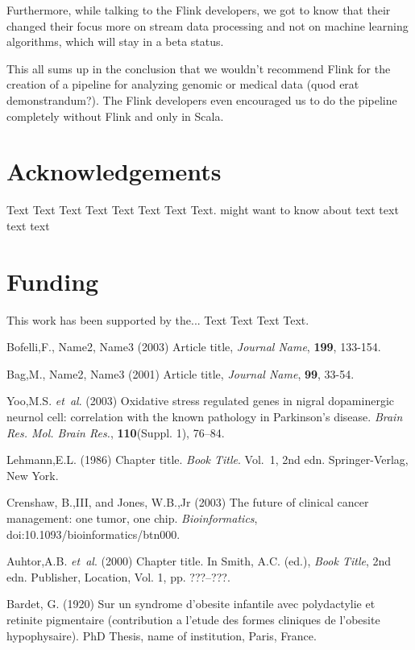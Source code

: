 \documentclass{bioinfo}
\begin{document}
Furthermore, while talking to the Flink developers, we got to know that their changed their focus more on stream data processing and not on machine learning algorithms, which will stay in a beta status.

This all sums up in the conclusion that we wouldn't recommend Flink for the creation of a pipeline for analyzing genomic or medical data (quod erat demonstrandum?). The Flink developers even encouraged us to do the pipeline completely without Flink and only in Scala.


\section*{Acknowledgements}

Text Text Text Text Text Text  Text Text.  \citealp{Boffelli03} might want to know about  text
text text text\vspace*{-12pt}

\section*{Funding}

This work has been supported by the... Text Text  Text Text.\vspace*{-12pt}

%
%
%
%
%
%
%
%
%


\begin{thebibliography}{}

Bofelli,F., Name2, Name3 (2003) Article title, {\it Journal Name}, {\bf 199}, 133-154.

Bag,M., Name2, Name3 (2001) Article title, {\it Journal Name}, {\bf 99}, 33-54.

Yoo,M.S. \textit{et~al}. (2003) Oxidative stress regulated genes
in nigral dopaminergic neurnol cell: correlation with the known
pathology in Parkinson's disease. \textit{Brain Res. Mol. Brain
Res.}, \textbf{110}(Suppl. 1), 76--84.

Lehmann,E.L. (1986) Chapter title. \textit{Book Title}. Vol.~1, 2nd edn. Springer-Verlag, New York.

Crenshaw, B.,III, and Jones, W.B.,Jr (2003) The future of clinical
cancer management: one tumor, one chip. \textit{Bioinformatics},
doi:10.1093/bioinformatics/btn000.

Auhtor,A.B. \textit{et~al}. (2000) Chapter title. In Smith, A.C.
(ed.), \textit{Book Title}, 2nd edn. Publisher, Location, Vol. 1, pp.
???--???.

Bardet, G. (1920) Sur un syndrome d'obesite infantile avec
polydactylie et retinite pigmentaire (contribution a l'etude des
formes cliniques de l'obesite hypophysaire). PhD Thesis, name of
institution, Paris, France.

\end{thebibliography}
\end{document}
